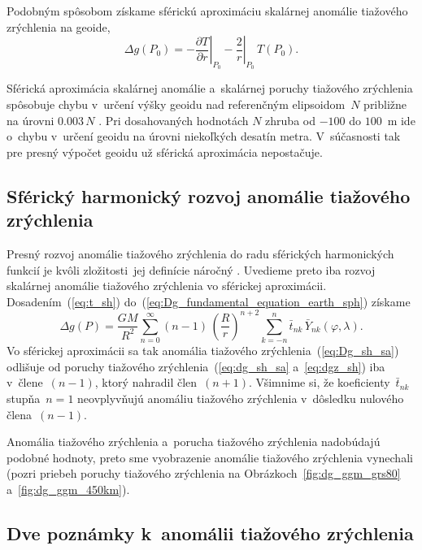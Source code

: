 \documentclass[a4paper, 12pt]{book}
\begin{document}
Podobným spôsobom získame sférickú aproximáciu skalárnej anomálie tiažového 
zrýchlenia na geoide,
%
\begin{equation}
\label{eq:Dg_fundamental_equation_geoid_sph}
\Delta g(P_0) = -\left.\frac{\partial T}{\partial r}\right|_{P_0} 
- \left.\frac{2}{r}\right|_{P_0} \, T(P_0){.}
\end{equation}

Sférická aproximácia skalárnej anomálie a~skalárnej poruchy tiažového 
zrýchlenia spôsobuje chybu v~určení výšky geoidu nad referenčným elipsoidom~$N$ 
približne na úrovni $0.003 \, N$ \parencite{MoritzPhysicalGeodesy}.  Pri 
dosahovaných hodnotách $N$ zhruba od $-100$ do $100$~m ide o~chybu v~určení 
geoidu na úrovni niekoľkých desatín metra.  V~súčasnosti tak pre presný výpočet 
geoidu už sférická aproximácia nepostačuje.


\subsection{Sférický harmonický rozvoj anomálie tiažového zrýchlenia}

Presný rozvoj anomálie tiažového zrýchlenia do radu sférických harmonických 
funkcií je kvôli zložitosti~jej definície náročný \parencite[pozri 
napríklad][]{Barthelmes2013}.  Uvedieme preto iba rozvoj skalárnej anomálie 
tiažového zrýchlenia vo sférickej aproximácii.  Dosadením~(\ref{eq:t_sh}) 
do~(\ref{eq:Dg_fundamental_equation_earth_sph}) získame
%
\begin{equation}
\label{eq:Dg_sh_sa}
\Delta g(P) = \frac{GM}{R^2} \sum_{n = 0}^\infty (n - 1) \, \left( \frac{R}{r} 
\right)^{n + 2} \sum_{k = -n}^{n} \bar{t}_{nk} \, \bar{Y}_{nk}(\varphi, 
\lambda){.}
\end{equation}
%
Vo sférickej aproximácii sa tak anomália tiažového 
zrýchlenia~(\ref{eq:Dg_sh_sa}) odlišuje od poruchy tiažového 
zrýchlenia~(\ref{eq:dg_sh_sa} a~\ref{eq:dgz_sh}) iba v~člene~$(n - 1)$, ktorý 
nahradil člen~$(n + 1)$.  Všimnime si, že  koeficienty~$\bar{t}_{nk}$ stupňa~$n 
= 1$ neovplyvňujú anomáliu tiažového zrýchlenia v~dôsledku nulového člena~$(n 
- 1)$.

Anomália tiažového zrýchlenia a~porucha tiažového zrýchlenia nadobúdajú podobné 
hodnoty, preto sme vyobrazenie anomálie tiažového zrýchlenia vynechali (pozri 
priebeh poruchy tiažového zrýchlenia na Obrázkoch~\ref{fig:dg_ggm_grs80} 
a~\ref{fig:dg_ggm_450km}).



\subsection*{Dve poznámky k~anomálii tiažového zrýchlenia}
\end{document}

